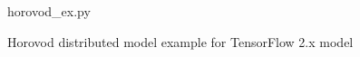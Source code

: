 



\begin{figure}[t!]
 
{horovod_ex.py}
  \caption{Horovod distributed model example for TensorFlow 2.x model}
\label{fig:back:hvd2} 
\end{figure}

